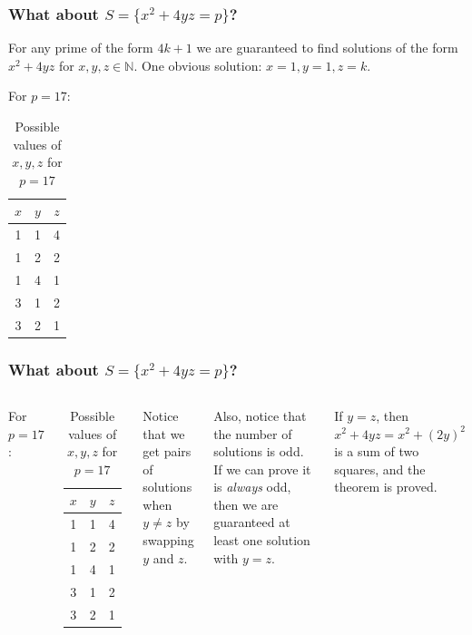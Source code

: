 \documentclass{beamer}
\begin{document}
\begin{frame}
	\frametitle{What about $S = \{x^2 + 4yz = p\}$?}

	For any prime of the form $4k+1$ we are guaranteed to find solutions of the form $x^2 + 4yz$
	for $x, y, z \in \mathbb{N}$. One obvious solution: $x=1, y=1, z=k$.

	For $p=17$:
	\begin{table}
	\begin{tabular}{|c|c|c|}
        \hline
		$x$ & $y$ & $z$ \\
        \hline
		1 & 1 & 4 \\
        	1 & 2 & 2 \\
        	1 & 4 & 1 \\
		3 & 1 & 2 \\
		3 & 2 & 1 \\
        \hline
	\end{tabular}
               \caption*{Possible values of $x,y,z$ for $p=17$}
	\end{table}

\end{frame}

\begin{frame}
	\frametitle{What about $S = \{x^2 + 4yz = p\}$?}

	\begin{columns}
	For $p=17$:
	\begin{table}
	\begin{tabular}{|c|c|c|}
        \hline
		$x$ & $y$ & $z$ \\
        \hline
		1 & 1 & 4 \\
        	1 & 2 & 2 \\
        	1 & 4 & 1 \\
		3 & 1 & 2 \\
		3 & 2 & 1 \\
        \hline
	\end{tabular}
               \caption*{Possible values of $x,y,z$ for $p=17$}
	\end{table}

		Notice that we get pairs of solutions when $y \neq z$ by swapping $y$
		and $z$.
	
		Also, notice that the number of solutions is odd. If we can prove it is
		{\em always} odd, then we are guaranteed at least one solution with $y=z$.

		If $y=z$, then $x^2+4yz = x^2 + (2y)^2$ is a sum of two squares, and the
		theorem is proved.
	\end{columns}

\end{frame}
\end{document}
